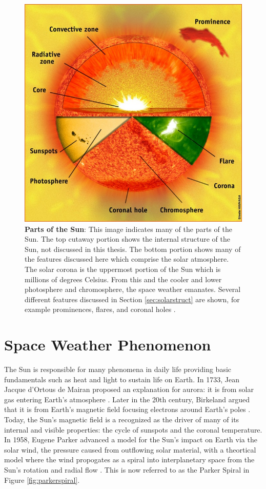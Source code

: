 \documentclass[twoside]{report}
\begin{document}
\begin{figure}[ht]
  \begin{center}
    \includegraphics[scale=0.4]{sunparts}
    \caption{{\bf Parts of the Sun}: This image indicates many of the parts of the Sun. The top cutaway portion shows the internal structure of the Sun, not discussed in this thesis. The bottom portion shows many of the features discussed here which comprise the solar atmosphere. The solar corona is the uppermost portion of the Sun which is millions of degrees Celsius. From this and the cooler and lower photosphere and chromosphere, the space weather emanates. Several different features discussed in Section \ref{sec:solarstruct} are shown, for example prominences, flares, and coronal holes \cite{sunparts}.}
    \label{fig:sunparts}
 \end{center}
\end{figure}


\section{Space Weather Phenomenon} \label{sec:space-weather-events}
The Sun is responsible for many phenomena in daily life providing basic fundamentals such as heat and light to sustain life on Earth. In 1733, Jean Jacque d'Ortous de Mairan proposed an explanation for aurora: it is from solar gas entering Earth's atmosphere \cite[p. 51]{langbook}. Later in the 20th century, Birkeland argued that it is from Earth's magnetic field focusing electrons around Earth's poles \cite[p. 51]{langbook}. Today, the Sun's magnetic field is a recognized as the driver of many of its internal and visible properties: the cycle of sunspots and the coronal temperature. In 1958, Eugene Parker advanced a model for the Sun's impact on Earth via the solar wind, the pressure caused from outflowing solar material, with a theortical model where the wind propogates as a spiral into interplanetary space from the Sun's rotation and radial flow \cite[p. 62]{langbook}. This is now referred to as the Parker Spiral in Figure \ref{fig:parkerspiral}. 
\end{document}
